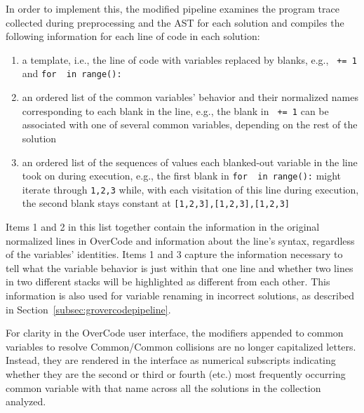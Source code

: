In order to implement this, the modified pipeline examines the program trace collected during preprocessing and the AST for each solution and compiles the following information for each line of code in each solution:
\begin{enumerate}
\item a template, i.e., the line of code with variables replaced by blanks, e.g., \texttt{\underline{\hspace{1em}} += 1} and \texttt{for \underline{\hspace{1em}} in range(\underline{\hspace{1em}}):}
\item an ordered list of the common variables' behavior and their normalized names corresponding to each blank in the line, e.g., the blank in \texttt{\underline{\hspace{1em}} += 1} can be associated with one of several common variables, depending on the rest of the solution
\item an ordered list of the sequences of values each blanked-out variable in the line took on during execution, e.g., the first blank in \texttt{for \underline{\hspace{1em}} in range(\underline{\hspace{1em}}):} might iterate through \texttt{1,2,3} while, with each visitation of this line during execution, the second blank stays constant at \texttt{[1,2,3],[1,2,3],[1,2,3]}
\end{enumerate}
Items 1 and 2 in this list together contain the information in the original normalized lines in OverCode and information about the line's syntax, regardless of the variables' identities. Items 1 and 3 capture the information necessary to tell what the variable behavior is just within that one line and whether two lines in two different stacks will be highlighted as different from each other. This information is also used for variable renaming in incorrect solutions, as described in Section~\ref{subsec:grovercodepipeline}.

For clarity in the OverCode user interface, the modifiers appended to common variables to resolve Common/Common collisions are no longer capitalized letters. Instead, they are rendered in the interface as numerical subscripts indicating whether they are the second or third or fourth (etc.) most frequently occurring common variable with that name across all the solutions in the collection analyzed.

